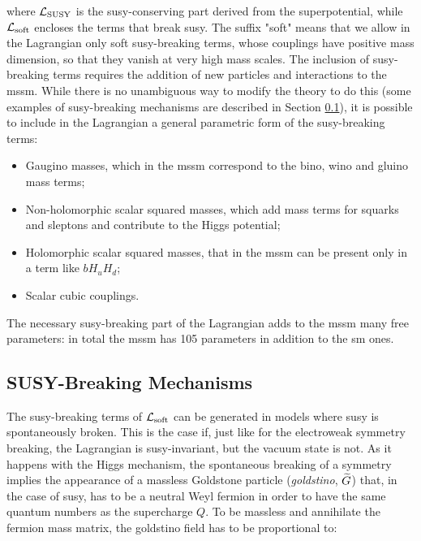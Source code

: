 \noindent where $\mathcal{L}_{\rm SUSY}$ is the \gls{susy}-conserving part derived from the superpotential, while $\mathcal{L}_{\rm soft}$ encloses the terms that break \gls{susy}. The suffix "soft" means that we allow in the Lagrangian only soft \gls{susy}-breaking terms, whose couplings have positive mass dimension, so that they vanish at very high mass scales. The inclusion of \gls{susy}-breaking terms requires the addition of new particles and interactions to the \gls{mssm}. While there is no unambiguous way to modify the theory to do this (some examples of \gls{susy}-breaking mechanisms are described in Section \ref{sec:susybreaking}), it is possible to include in the Lagrangian a general parametric form of the \gls{susy}-breaking terms:
\begin{itemize}
\item Gaugino masses, which in the \gls{mssm} correspond to the bino, wino and gluino mass terms;
\item Non-holomorphic scalar squared masses, which add mass terms for squarks and sleptons and contribute to the Higgs potential;
\item Holomorphic scalar squared masses, that in the \gls{mssm} can be present only in a term like $b H_u H_d$;
\item Scalar cubic couplings.
\end{itemize}  

The necessary \gls{susy}-breaking part of the Lagrangian adds to the \gls{mssm} many free parameters: in total the \gls{mssm} has 105 parameters in addition to the \gls{sm} ones.


\subsection{SUSY-Breaking Mechanisms}
\label{sec:susybreaking}

The \gls{susy}-breaking terms of $\mathcal{L}_{\rm soft}$ can be generated in models where \gls{susy} is spontaneously broken. This is the case if, just like  for the electroweak symmetry breaking, the Lagrangian is \gls{susy}-invariant, but the vacuum state is not. As it happens with the Higgs mechanism, the spontaneous breaking of a symmetry implies the appearance of a massless Goldstone particle (\textit{goldstino}, $\widetilde{G}$) that, in the case of \gls{susy}, has to be a neutral Weyl fermion in order to have the same quantum numbers as the supercharge $Q$. To be massless and annihilate the fermion mass matrix, the goldstino field has to be proportional to:

